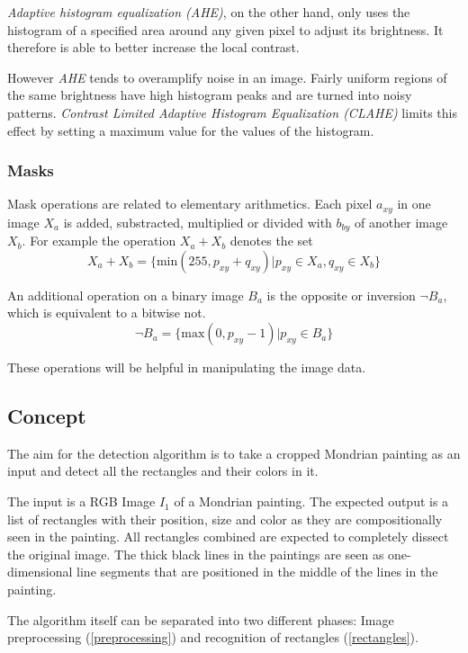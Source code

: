 \documentclass[serif,article,noparskip]{agse-thesis}
\begin{document}
\textit{Adaptive histogram equalization (AHE)}, on the other hand, only uses the
histogram of a specified area around any given pixel to adjust its brightness. It
therefore is able to better increase the local contrast.

However \textit{AHE} tends to overamplify noise in an image. Fairly uniform
regions of the same brightness have high histogram peaks and are turned into
noisy patterns.  \textit{Contrast Limited Adaptive Histogram Equalization
(CLAHE)} limits this effect by setting a maximum value for the values of the
histogram. \cite{Pizer1987}

\subsubsection{Masks}

Mask operations are related to elementary arithmetics. Each pixel $a_{xy}$ in
one image  $X_a$ is added, substracted, multiplied or divided with $b_{by}$ of
another image $X_b$. For example the operation $X_a + X_b$ denotes the set
$$X_a + X_b = \{\mathrm{min}(255, p_{xy} + q_{xy}) | p_{xy} \in X_a, q_{xy} \in X_b\}$$

An additional operation on a binary image $B_a$ is the opposite or inversion
$\neg B_a$, which is equivalent to a bitwise not.
$$\neg B_a = \{\mathrm{max}(0,p_{xy} - 1) | p_{xy} \in B_a\}$$

These operations will be helpful in manipulating the image data.

\subsection{Concept} \label{concept}

The aim for the detection algorithm is to take a cropped Mondrian painting as
an input and detect all the rectangles and their colors in it.

The input is a RGB Image $I_1$ of a Mondrian painting. The expected output is a
list of rectangles with their position, size and color as they are
compositionally seen in the painting. All rectangles combined are expected to
completely dissect the original image. The thick black lines in the paintings are
seen as one-dimensional line segments that are positioned in the middle of the
lines in the painting.

The algorithm itself can be separated into two different phases: Image
preprocessing (\ref{preprocessing}) and recognition of rectangles (\ref{rectangles}).
\end{document}
